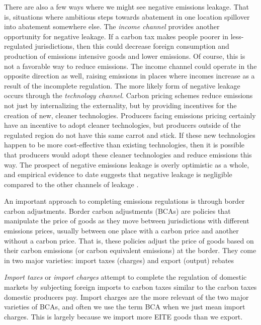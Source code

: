 There are also a few ways where we might see negative emissions leakage. That is, situations where ambitious steps towards abatement in one location spillover into abatement somewhere else. The \emph{income channel} provides another opportunity for negative leakage. If a carbon tax makes people poorer in less-regulated jurisdictions, then this could decrease foreign consumption and production of emissions intensive goods and lower emissions. Of course, this is not a favorable way to reduce emissions. The income channel could operate in the opposite direction as well, raising emissions in places where incomes increase as a result of the incomplete regulation. The more likely form of negative leakage occurs through the \emph{technology channel}. Carbon pricing schemes reduce emissions not just by internalizing the externality, but by providing incentives for the creation of new, cleaner technologies. Producers facing emissions pricing certainly have an incentive to adopt cleaner technologies, but producers outside of the regulated region do not have this same carrot and stick. If these new technologies happen to be more cost-effective than existing technologies, then it is possible that producers would adopt these cleaner technologies and reduce emissions this way. The prospect of negative emissions leakage is overly optimistic as a whole, and empirical evidence to date suggests that negative leakage is negligible compared to the other channels of leakage \citep{winchester2013numerical}.


An important approach to completing emissions regulations is through border carbon adjustments. Border carbon adjustments (BCAs) are policies that manipulate the price of goods as they move between jurisdictions with different emissions prices, usually between one place with a carbon price and another without a carbon price. That is, these policies adjust the price of goods based on their carbon emissions (or carbon equivalent emissions) at the border. They come in two major varieties: import taxes (charges) and export (output) rebates

\emph{Import taxes} or \emph{import charges} attempt to complete the regulation of domestic markets by subjecting foreign imports to carbon taxes similar to the carbon taxes domestic producers pay. Import charges are the more relevant of the two major varieties of BCAs, and often we use the term BCA when we just mean import charges. This is largely because we import more EITE goods than we export. 

